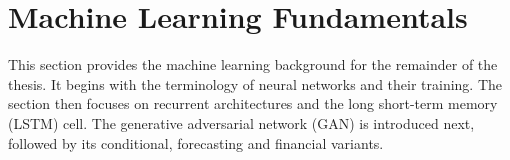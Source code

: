 \section{Machine Learning Fundamentals}\label{sec:ml-fundamentals}
This section provides the machine learning background for the remainder of the thesis. It begins with the terminology of neural networks and their training. The section then focuses on recurrent architectures and the long short-term memory (LSTM) cell. The generative adversarial network (GAN) is introduced next, followed by its conditional, forecasting and financial variants.






